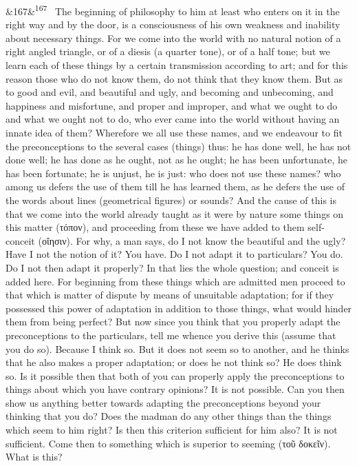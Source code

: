 \documentclass[12pt]{article}
\newcommand{\para}[1][]{\par\noindent\ifx&#1&\else\textsuperscript{\footnotesize #1}~\fi}
\begin{document}
\para[167] The beginning of philosophy to him at least who enters on it in the right way and by the door, is a consciousness of his own weakness and inability about necessary things. For we come into the world with no natural notion of a right angled triangle, or of a diesis (a quarter tone), or of a half tone; but we learn each of these things by a certain transmission according to art; and for this reason those who do not know them, do not think that they know them. But as to good and evil, and beautiful and ugly, and becoming and unbecoming, and happiness and misfortune, and proper and improper, and what we ought to do and what we ought not to do, who ever came into the world without having an innate idea of them? Wherefore we all use these names, and we endeavour to fit the preconceptions to the several cases (things) thus: he has done well, he has not done well; he has done as he ought, not as he ought; he has been unfortunate, he has been fortunate; he is unjust, he is just: who does not use these names? who among us defers the use of them till he has learned them, as he defers the use of the words about lines (geometrical figures) or sounds? And the cause of this is that we come into the world already taught as it were by nature some things on this matter (τόπον), and proceeding from these we have added to them self-conceit (οἴησιν). For why, a man says, do I not know the beautiful and the ugly? Have I not the notion of it? You have. Do I not adapt it to particulars? You do. Do I not then adapt it properly? In that lies the whole question; and conceit is added here. For beginning from these things which are admitted men proceed to that which is matter of dispute by means of unsuitable adaptation; for if they possessed this power of adaptation in addition to those things, what would hinder them from being perfect? But now since you think that you properly adapt the preconceptions to the particulars, tell me whence you derive this (assume that you do so). Because I think so. But it does not seem so to another, and he thinks that he also makes a proper adaptation; or does he not think so? He does think so. Is it possible then that both of you can properly apply the preconceptions to things about which you have contrary opinions? It is not possible. Can you then show us anything better towards adapting the preconceptions beyond your thinking that you do? Does the madman do any other things than the things which seem to him right? Is then this criterion sufficient for him also? It is not sufficient. Come then to something which is superior to seeming (τοῦ δοκεῖν). What is this?
\end{document}
